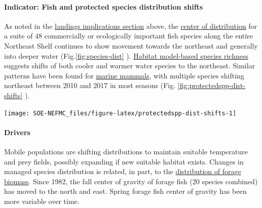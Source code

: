 \documentclass[
  10pt,
]{article}
\let\origfigure\figure
\let\endorigfigure\endfigure
\renewenvironment{figure}[1][2] {
    \expandafter\origfigure\expandafter[H]
} {
    \endorigfigure
}
\begin{document}
\hypertarget{indicator-fish-and-protected-species-distribution-shifts}{%
\paragraph{Indicator: Fish and protected species distribution shifts}\label{indicator-fish-and-protected-species-distribution-shifts}}

As noted in the \protect\hyperlink{implications}{landings implications section} above, the \href{https://noaa-edab.github.io/catalog/species_dist.html}{center of distribution} for a suite of 48 commercially or ecologically important fish species along the entire Northeast Shelf continues to show movement towards the northeast and generally into deeper water (Fig.\ref{fig:species-dist} ). \href{https://noaa-edab.github.io/catalog/habitat_diversity.html}{Habitat model-based species richness} suggests shifts of both cooler and warmer water species to the northeast. Similar patterns have been found for \href{https://noaa-edab.github.io/catalog/HMS_species_distribution.html}{marine mammals}, with multiple species shifting northeast between 2010 and 2017 in most seasons (Fig. \ref{fig:protectedspp-dist-shifts} ).

\begin{figure}

{\centering \texttt{[image: SOE-NEFMC\_files/figure-latex/protectedspp-dist-shifts-1]} 

}

\caption{Direction and magnitude of core habitat shifts, represented by the length of the line of the seasonal weighted centroid for species with more than 70 km difference between 2010 and 2017 (tip of arrow).}\label{fig:protectedspp-dist-shifts}
\end{figure}

\hypertarget{drivers}{%
\paragraph{Drivers}\label{drivers}}

Mobile populations are shifting distributions to maintain suitable temperature and prey fields, possibly expanding if new suitable habitat exists. Changes in managed species distribution is related, in part, to the \href{https://noaa-edab.github.io/catalog/forage_index.html}{distribution of forage biomass}. Since 1982, the fall center of gravity of forage fish (20 species combined) has moved to the north and east. Spring forage fish center of gravity has been more variable over time.
\end{document}
